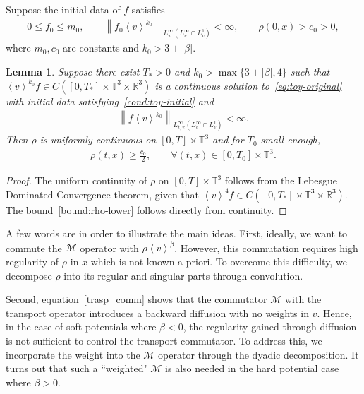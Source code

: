 \documentclass[11pt,american, reqno]{amsart}
\numberwithin{equation}{section}
\newtheorem{lemma}[theorem]{Lemma}
\newtheorem{remark}{Remark}
\newcommand{\R}{\mathbb R}
\newcommand{\1}{\mathds{1}}
\newcommand{\CalM}{\mathcal{M}}
\newcommand{\norm}[1]{\left\lVert#1\right\rVert}
\newcommand{\vint}[1]{\left\langle#1\right\rangle}
\newcommand{\T}{\mathbb{T}}
\numberwithin{equation}{section}
\begin{document}
Suppose the initial data of $f$ satisfies
\begin{align} \label{cond:toy-initial}
   0 \leq f_0 \leq m_0, 
\qquad  
  \norm{f_0 \vint{v}^{k_0}}_{L^\infty_{x} (L^\infty_v \cap L^1_v)} < \infty, 
\qquad
   \rho(0, x) > c_0 > 0, 
\end{align}
where $m_0, c_0$ are constants and $k_0 > 3 + |\beta|$. 

\begin{lemma} \label{lem:toy-space}
Suppose there exist $T_\ast > 0$ and $k_0 > \max\{3 + |\beta|, 4\}$ such that $\vint{v}^{k_0} f \in C([0, T_\ast] \times \T^3 \times \R^3)$ is a continuous solution to~\eqref{eq:toy-original} with 
initial data satisfying~\eqref{cond:toy-initial} and 
\begin{align*}
  \norm{f \vint{v}^{k_0}}_{L^\infty_{t,x} (L^\infty_v \cap L^1_v)} < \infty.
\end{align*}
Then $\rho$ is uniformly continuous  on $[0, T] \times \T^3$ and for $T_0$ small enough, 
\begin{align} \label{bound:rho-lower}
   \rho(t, x) \geq \frac{c_0}{2}, 
\qquad
   \forall (t, x) \in [0, T_0] \times \T^3.
\end{align}
\end{lemma}
\begin{proof}
The uniform continuity of $\rho$ on $[0, T] \times \T^3$ follows from the Lebesgue Dominated Convergence theorem, given that $\vint{v}^4 f \in C([0, T_\ast] \times \T^3 \times \R^3)$. The bound~\eqref{bound:rho-lower} follows directly from continuity. 
\end{proof}



A few words are in order to illustrate the main ideas. First, ideally, we want to commute the $\CalM$ operator with $\rho \vint{v}^\beta$. However, this commutation requires high regularity of $\rho$ in $x$ which is not known a priori. To overcome this difficulty, we decompose $\rho$ into its regular and singular parts through convolution. 

Second, equation~\eqref{trasp_comm} shows that the commutator $\CalM$ with the transport operator introduces a backward diffusion with no weights in $v$. Hence, in the case of soft potentials where $\beta < 0$, the regularity gained through diffusion is not sufficient to control the transport commutator. To address this, we incorporate the weight into the $\CalM$ operator through the dyadic decomposition. It turns out that such a ``weighted" $\CalM$ is also needed in the hard potential case where $\beta > 0$. 
\end{document}
